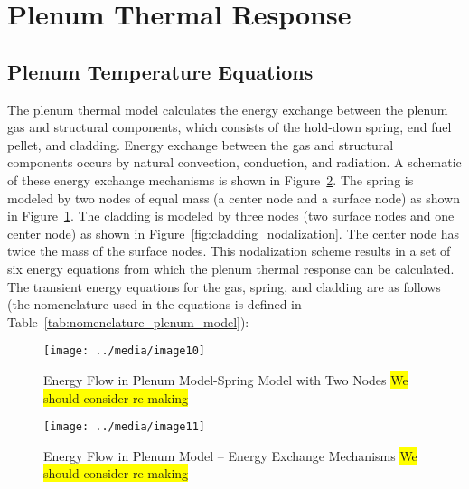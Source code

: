 \section{Plenum Thermal Response}\label{section:fuel-rod-thermal-response}

\subsection{Plenum Temperature Equations}\label{section:plenum-temperature-equations}

The plenum thermal model calculates the energy exchange between the plenum gas and structural
components, which consists of the hold-down spring, end fuel pellet, and cladding. Energy exchange
between the gas and structural components occurs by natural convection, conduction, and radiation. A
schematic of these energy exchange mechanisms is shown in
Figure~\ref{fig:energy_flow_plenum_model_energy_exchange}. The spring is modeled by two nodes of
equal mass (a center node and a surface node) as shown in
Figure~\ref{fig:energy_flow_plenum_model_spring_2_nodes}. The cladding is modeled by three nodes
(two surface nodes and one center node) as shown in Figure~\ref{fig:cladding_nodalization}. The
center node has twice the mass of the surface nodes. This nodalization scheme results in a set of
six energy equations from which the plenum thermal response can be calculated. The transient energy
equations for the gas, spring, and cladding are as follows (the nomenclature used in the equations
is defined in Table~\ref{tab:nomenclature_plenum_model}):

\begin{figure}
    \texttt{[image: ../media/image10]}
    \caption{Energy Flow in Plenum Model-Spring Model with Two Nodes \colorbox{yellow}{We should consider re-making}}
    \label{fig:energy_flow_plenum_model_spring_2_nodes}
\end{figure}

\begin{figure}
    \texttt{[image: ../media/image11]}
    \caption{Energy Flow in Plenum Model -- Energy Exchange Mechanisms \colorbox{yellow}{We should consider re-making}}
    \label{fig:energy_flow_plenum_model_energy_exchange}
\end{figure}

